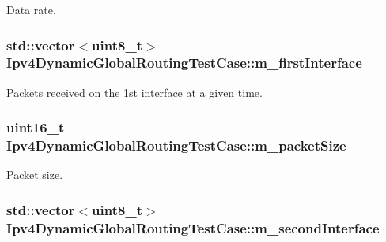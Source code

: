 Data rate. 

\subsubsection[{\texorpdfstring{m\+\_\+first\+Interface}{m_firstInterface}}]{\setlength{\rightskip}{0pt plus 5cm}std\+::vector$<$uint8\+\_\+t$>$ Ipv4\+Dynamic\+Global\+Routing\+Test\+Case\+::m\+\_\+first\+Interface\hspace{0.3cm}{\ttfamily [private]}}\hypertarget{classIpv4DynamicGlobalRoutingTestCase_ac0a40f532a0ce5c35d25681227e9cee1}{}\label{classIpv4DynamicGlobalRoutingTestCase_ac0a40f532a0ce5c35d25681227e9cee1}


Packets received on the 1st interface at a given time. 

\subsubsection[{\texorpdfstring{m\+\_\+packet\+Size}{m_packetSize}}]{\setlength{\rightskip}{0pt plus 5cm}uint16\+\_\+t Ipv4\+Dynamic\+Global\+Routing\+Test\+Case\+::m\+\_\+packet\+Size\hspace{0.3cm}{\ttfamily [private]}}\hypertarget{classIpv4DynamicGlobalRoutingTestCase_a36e3a40f9475449e874fe30cb3e89fb6}{}\label{classIpv4DynamicGlobalRoutingTestCase_a36e3a40f9475449e874fe30cb3e89fb6}


Packet size. 

\subsubsection[{\texorpdfstring{m\+\_\+second\+Interface}{m_secondInterface}}]{\setlength{\rightskip}{0pt plus 5cm}std\+::vector$<$uint8\+\_\+t$>$ Ipv4\+Dynamic\+Global\+Routing\+Test\+Case\+::m\+\_\+second\+Interface\hspace{0.3cm}{\ttfamily [private]}}\hypertarget{classIpv4DynamicGlobalRoutingTestCase_a4ff27c5c56ed3b6edf1f5cefc2e5f081}{}\label{classIpv4DynamicGlobalRoutingTestCase_a4ff27c5c56ed3b6edf1f5cefc2e5f081}


